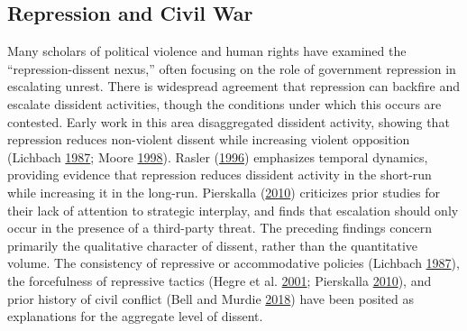 \documentclass[12pt,]{article}
\theoremstyle{definition}
\theoremstyle{definition}
\theoremstyle{definition}
\theoremstyle{remark}
\begin{document}
\hypertarget{repression-and-civil-war}{%
\subsection{Repression and Civil War}\label{repression-and-civil-war}}

Many scholars of political violence and human rights have examined the
``repression-dissent nexus,'' often focusing on the role of government
repression in escalating unrest. There is widespread agreement that
repression can backfire and escalate dissident activities, though the
conditions under which this occurs are contested. Early work in this
area disaggregated dissident activity, showing that repression reduces
non-violent dissent while increasing violent opposition (Lichbach
\protect\hyperlink{ref-Lichbach1987}{1987}; Moore
\protect\hyperlink{ref-Moore1998}{1998}). Rasler
(\protect\hyperlink{ref-Rasler1996}{1996}) emphasizes temporal dynamics,
providing evidence that repression reduces dissident activity in the
short-run while increasing it in the long-run. Pierskalla
(\protect\hyperlink{ref-Pierskalla2010}{2010}) criticizes prior studies
for their lack of attention to strategic interplay, and finds that
escalation should only occur in the presence of a third-party threat.
The preceding findings concern primarily the qualitative character of
dissent, rather than the quantitative volume. The consistency of
repressive or accommodative policies (Lichbach
\protect\hyperlink{ref-Lichbach1987}{1987}), the forcefulness of
repressive tactics (Hegre et al.
\protect\hyperlink{ref-Hegre2001}{2001}; Pierskalla
\protect\hyperlink{ref-Pierskalla2010}{2010}), and prior history of
civil conflict (Bell and Murdie \protect\hyperlink{ref-Bell2018}{2018})
have been posited as explanations for the aggregate level of dissent.
\end{document}
